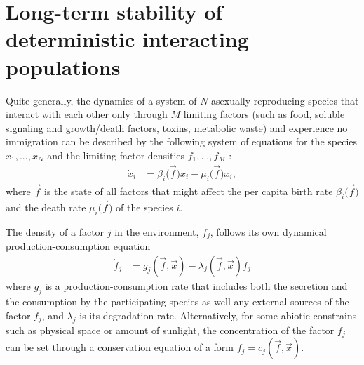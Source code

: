 \section{Long-term stability of deterministic interacting populations}
Quite generally, the dynamics of a system of $N$ asexually reproducing species that interact with each other only through $M$ limiting factors (such as food, soluble signaling and growth/death factors, toxins, metabolic waste) and experience no immigration can be described by the following system of equations for the species $x_1,...,x_N$ and the limiting factor densities $f_1,...,f_M$ \cite{Armstrong1976,McGehee1977a,Armstrong1980}:
\begin{align}\label{eq-xi}
\dot{x}_i &= \beta_i\big(\vec{f}\big)x_i - \mu_i\big(\vec{f}\big) x_i,
\end{align}
where $\vec{f}$ is the state of all factors that might affect the per capita birth rate $\beta_i\big(\vec{f}\big)$  and the death rate $\mu_i\big(\vec{f}\big)$ of the species $i$.

The density of a factor $j$ in the environment, $f_j$, follows its own dynamical production-consumption equation
\begin{align}\label{eq-fj}
\dot{f}_j &= g_j(\vec{f},\vec{x}) - \lambda_j(\vec{f},\vec{x}) f_j
\end{align}
where  $g_j$ is a production-consumption rate that includes both the secretion and the consumption by the participating species as well any external sources of the factor $f_j$, and $\lambda_j$ is its degradation rate. Alternatively, for some abiotic constrains such as physical space or amount of sunlight, the concentration of the factor $f_j$ can be set through a conservation equation of a form \cite{McGehee1977a,Armstrong1980} $f_j = c_j(\vec{f},\vec{x})$.


